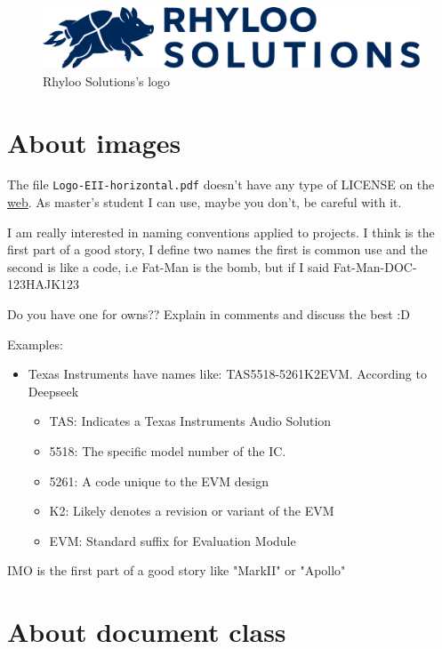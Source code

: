\documentclass[english]{reporti}
\begin{document}
\begin{figure}[htbp]
\centering
\includegraphics[fbox,width=.9\linewidth]{./figures/logo/rhyloo_solutions_horizontal.pdf}
\caption{Rhyloo Solutions's logo}
\end{figure}


\section{About images}
\label{sec:orgbb3a405}
The file \texttt{Logo-EII-horizontal.pdf} doesn't have any type of LICENSE on the \href{https://www.uma.es/escuela-de-ingenierias-industriales/info/108566/logo-simbolo-de-la-eii/}{web}. As master's student I can use, maybe you don't, be careful with it.

I am really interested in naming conventions applied to projects. I think is the first part of a good story, I define two names the first is common use and the second is like a code, i.e Fat-Man is the bomb, but if I said Fat-Man-DOC-123HAJK123

Do you have one for owns?? Explain in comments and discuss the best :D

Examples:
\begin{itemize}
\item Texas Instruments have names like: TAS5518-5261K2EVM. According to Deepseek
\begin{itemize}
\item TAS: Indicates a Texas Instruments Audio Solution
\item 5518: The specific model number of the IC.
\item 5261: A code unique to the EVM design
\item K2: Likely denotes a revision or variant of the EVM
\item EVM: Standard suffix for Evaluation Module
\end{itemize}
\end{itemize}

IMO is the first part of a good story like "MarkII" or "Apollo"


\section{About document class}
\label{sec:orgad0479b}
\end{document}
